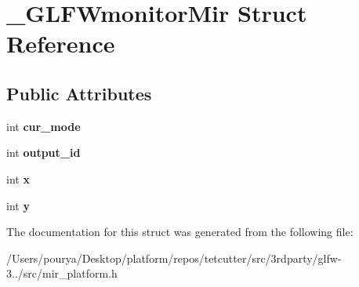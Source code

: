 \hypertarget{struct__GLFWmonitorMir}{}\section{\+\_\+\+G\+L\+F\+Wmonitor\+Mir Struct Reference}
\label{struct__GLFWmonitorMir}
\subsection*{Public Attributes}
\begin{DoxyCompactItemize}
\item 
\hypertarget{struct__GLFWmonitorMir_a2f5d7c09f42d2ac9cfa728744d832037}{}int {\bfseries cur\+\_\+mode}\label{struct__GLFWmonitorMir_a2f5d7c09f42d2ac9cfa728744d832037}

\item 
\hypertarget{struct__GLFWmonitorMir_adf3448361e62185313e0764333fa98bc}{}int {\bfseries output\+\_\+id}\label{struct__GLFWmonitorMir_adf3448361e62185313e0764333fa98bc}

\item 
\hypertarget{struct__GLFWmonitorMir_a8d299a59575b73721fcb695b18e9790a}{}int {\bfseries x}\label{struct__GLFWmonitorMir_a8d299a59575b73721fcb695b18e9790a}

\item 
\hypertarget{struct__GLFWmonitorMir_a3a52e43dfa33c91271fc1fc606e8741e}{}int {\bfseries y}\label{struct__GLFWmonitorMir_a3a52e43dfa33c91271fc1fc606e8741e}

\end{DoxyCompactItemize}


The documentation for this struct was generated from the following file\+:\begin{DoxyCompactItemize}
\item 
/\+Users/pourya/\+Desktop/platform/repos/tetcutter/src/3rdparty/glfw-\/3../src/mir\+\_\+platform.\+h\end{DoxyCompactItemize}
